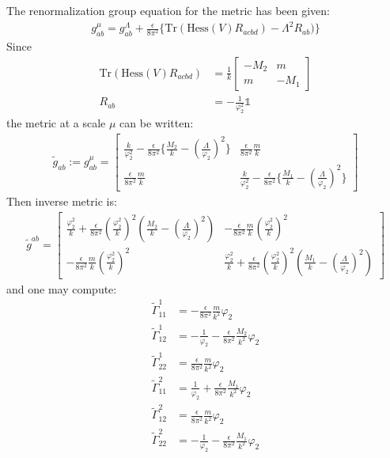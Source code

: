 \documentclass[fleqn]{article}
\begin{document}
The renormalization group equation for the metric has been given:
\begin{align}
g_{ab} ^{\mu} = g_{ab} ^{\Lambda} + \frac{\epsilon}{8\pi^{2}} \lbrace \text{Tr} (\text{Hess}(V) R_{acbd}) - \Lambda ^{2} R_{ab}) \rbrace 
\end{align}
Since
\begin{align}
\text{Tr} (\text{Hess}(V) R_{acbd}) &= \frac{1}{k} 
\begin{bmatrix}
-M_{2} & m \\
m & -M_{1}
\end{bmatrix} \\
R_{ab} &= - \frac{1}{\varphi_{2} ^{2}} \mathbb{1}
\end{align}
the metric at a scale $\mu$ can be written:
\begin{align}
\tilde g_{ab} := g_{ab}^{\mu} = 
\begin{bmatrix}
\frac{k}{\varphi _{2} ^{2}}  - \frac{\epsilon}{8\pi^{2}} \lbrace \frac{M_{2}}{k} - (\frac{\Lambda}{\varphi_{2}})^2 \rbrace & \frac{\epsilon}{8\pi^{2}}\frac{m}{k} \\
\frac{\epsilon}{8\pi^{2}}\frac{m}{k} & \frac{k}{\varphi _{2} ^{2}} - \frac{\epsilon}{8\pi^{2}} \lbrace \frac{M_{1}}{k} - (\frac{\Lambda}{\varphi_{2}})^2 \rbrace 
\end{bmatrix}
\end{align}
Then inverse metric is:
\begin{align}
\tilde g ^{ab} = 
\begin{bmatrix}
\frac{\varphi_{2}^{2}}{k} + \frac{\epsilon}{8\pi^{2}}(\frac{\varphi_{2}^{2}}{k})^{2}(\frac{M_{2}}{k} - (\frac{\Lambda}{\varphi_{2}})^{2}) & -\frac{\epsilon}{8\pi^{2}}\frac{m}{k}(\frac{\varphi_{2} ^{2}}{k})^{2} \\
-\frac{\epsilon}{8\pi^{2}}\frac{m}{k}(\frac{\varphi_{2} ^{2}}{k})^{2} & \frac{\varphi_{2}^{2}}{k} + \frac{\epsilon}{8\pi^{2}}(\frac{\varphi_{2}^{2}}{k})^{2}(\frac{M_{1}}{k} - (\frac{\Lambda}{\varphi_{2}})^{2})
\end{bmatrix}
\end{align}
and one may compute:
\begin{align}
\tilde \Gamma _{11}^{1} &= -\frac{\epsilon}{8\pi^{2}}\frac{m}{k^2} \varphi_{2} \\
\tilde \Gamma _{12}^{1} &= -\frac{1}{\varphi_{2}} - \frac{\epsilon}{8\pi^{2}} \frac{M_{2}}{k^{2}}\varphi_{2}  \\
\tilde \Gamma _{22}^{1} &= \frac{\epsilon}{8\pi^{2}} \frac{m}{k^{2}}\varphi_{2} \\
\tilde \Gamma _{11}^{2} &= \frac{1}{\varphi_{2}} + \frac{\epsilon}{8\pi^{2}}\frac{M_{1}}{k^{2}}\varphi_{2} \\
\tilde \Gamma _{12} ^{2} &= \frac{\epsilon}{8\pi^2} \frac{m}{k^{2}}\varphi_{2} \\
\tilde \Gamma _{22}^{2} &= -\frac{1}{\varphi_{2}} - \frac{\epsilon}{8\pi^{2}}\frac{M_{1}}{k^{2}} \varphi_{2}
\end{align}
\end{document}
